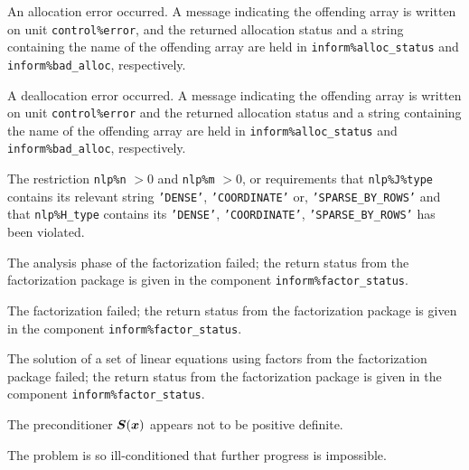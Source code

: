 \documentclass{galahad}
\begin{document}
\begin{description}

 An allocation error occurred.
A message indicating the offending
array is written on unit {\tt control\%error}, and the returned allocation
status and a string containing the name of the offending array
are held in {\tt inform\%alloc\_\-status}
and {\tt inform\%bad\_alloc}, respectively.

 A deallocation error occurred.
A message indicating the offending
array is written on unit {\tt control\%error} and the returned allocation
status and a string containing the name of the offending array
are held in {\tt inform\%alloc\_\-status}
and {\tt inform\%bad\_alloc}, respectively.

  The restriction {\tt nlp\%n} $> 0$ and {\tt nlp\%m} $> 0$,
  or requirements that
  {\tt nlp\%J\%type}  contains its relevant string
  \mbox{\tt 'DENSE'}, \mbox{\tt 'COORDINATE'} or, \mbox{\tt 'SPARSE\_BY\_ROWS'}
  and that {\tt nlp\%H\_type} contains its
  {\tt 'DENSE'}, {\tt 'COORDINATE'}, {\tt 'SPARSE\_BY\_ROWS'}
  has been violated.



 The analysis phase of the factorization failed;
 the return status from the factorization
    package is given in the component {\tt inform\%fac\-t\-or\_status}.

 The factorization failed;
 the return status from the factorization
    package is given in the component {\tt inform\%fac\-t\-or\_status}.

 The solution of a set of linear equations
 using factors from the factorization package failed;
 the return status from the factorization
    package is given in the component {\tt inform\%fac\-t\-or\_status}.

 The preconditioner ${\bm{S}}({\bm{x}})$ appears not to
  be positive definite.

 The problem is so ill-conditioned that
  further progress is impossible.


\end{description}
\end{document}
